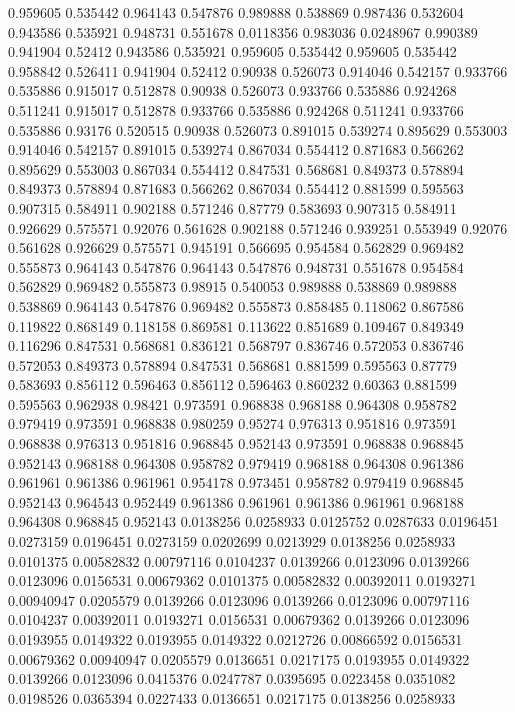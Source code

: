 0.959605 0.535442
0.964143 0.547876
0.989888 0.538869
0.987436 0.532604
0.943586 0.535921
0.948731 0.551678
0.0118356 0.983036
0.0248967 0.990389
0.941904 0.52412
0.943586 0.535921
0.959605 0.535442
0.959605 0.535442
0.958842 0.526411
0.941904 0.52412
0.90938 0.526073
0.914046 0.542157
0.933766 0.535886
0.915017 0.512878
0.90938 0.526073
0.933766 0.535886
0.924268 0.511241
0.915017 0.512878
0.933766 0.535886
0.924268 0.511241
0.933766 0.535886
0.93176 0.520515
0.90938 0.526073
0.891015 0.539274
0.895629 0.553003
0.914046 0.542157
0.891015 0.539274
0.867034 0.554412
0.871683 0.566262
0.895629 0.553003
0.867034 0.554412
0.847531 0.568681
0.849373 0.578894
0.849373 0.578894
0.871683 0.566262
0.867034 0.554412
0.881599 0.595563
0.907315 0.584911
0.902188 0.571246
0.87779 0.583693
0.907315 0.584911
0.926629 0.575571
0.92076 0.561628
0.902188 0.571246
0.939251 0.553949
0.92076 0.561628
0.926629 0.575571
0.945191 0.566695
0.954584 0.562829
0.969482 0.555873
0.964143 0.547876
0.964143 0.547876
0.948731 0.551678
0.954584 0.562829
0.969482 0.555873
0.98915 0.540053
0.989888 0.538869
0.989888 0.538869
0.964143 0.547876
0.969482 0.555873
0.858485 0.118062
0.867586 0.119822
0.868149 0.118158
0.869581 0.113622
0.851689 0.109467
0.849349 0.116296
0.847531 0.568681
0.836121 0.568797
0.836746 0.572053
0.836746 0.572053
0.849373 0.578894
0.847531 0.568681
0.881599 0.595563
0.87779 0.583693
0.856112 0.596463
0.856112 0.596463
0.860232 0.60363
0.881599 0.595563
0.962938 0.98421
0.973591 0.968838
0.968188 0.964308
0.958782 0.979419
0.973591 0.968838
0.980259 0.95274
0.976313 0.951816
0.973591 0.968838
0.976313 0.951816
0.968845 0.952143
0.973591 0.968838
0.968845 0.952143
0.968188 0.964308
0.958782 0.979419
0.968188 0.964308
0.961386 0.961961
0.961386 0.961961
0.954178 0.973451
0.958782 0.979419
0.968845 0.952143
0.964543 0.952449
0.961386 0.961961
0.961386 0.961961
0.968188 0.964308
0.968845 0.952143
0.0138256 0.0258933
0.0125752 0.0287633
0.0196451 0.0273159
0.0196451 0.0273159
0.0202699 0.0213929
0.0138256 0.0258933
0.0101375 0.00582832
0.00797116 0.0104237
0.0139266 0.0123096
0.0139266 0.0123096
0.0156531 0.00679362
0.0101375 0.00582832
0.00392011 0.0193271
0.00940947 0.0205579
0.0139266 0.0123096
0.0139266 0.0123096
0.00797116 0.0104237
0.00392011 0.0193271
0.0156531 0.00679362
0.0139266 0.0123096
0.0193955 0.0149322
0.0193955 0.0149322
0.0212726 0.00866592
0.0156531 0.00679362
0.00940947 0.0205579
0.0136651 0.0217175
0.0193955 0.0149322
0.0139266 0.0123096
0.0415376 0.0247787
0.0395695 0.0223458
0.0351082 0.0198526
0.0365394 0.0227433
0.0136651 0.0217175
0.0138256 0.0258933
